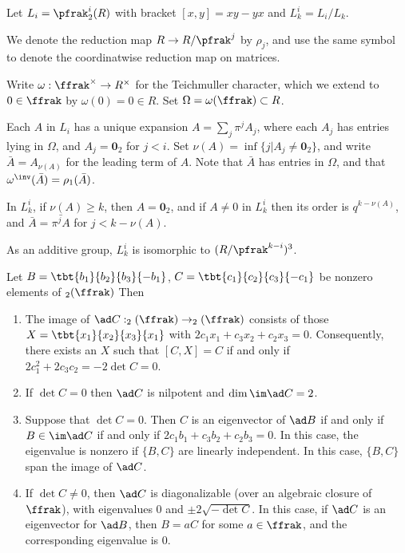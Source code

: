 Let $L_i = \pfrak^i \sl_2(R)$ with bracket $[x,y]=xy-yx$ and $L_k^i = L_i/L_k$.

We denote the reduction map $R \to R/\pfrak^j$ by $\rho_j$, and use the same symbol to denote the coordinatwise reduction map on matrices.

Write $\omega:\ffrak^\times \to R^\times$ for the Teichmuller character, which we extend to $0\in \ffrak$ by $\omega(0)=0 \in R$. Set $\Omega=\omega(\ffrak) \subset R$.

Each $A$ in $L_i$ has a unique expansion $A = \sum_j \pi^j A_j$, where each $A_j$ has entries lying in $\Omega$, and $A_j = \bm{0}_2$ for $j< i$. Set $\nu(A) = \inf\{j| A_j \neq \bm{0}_2\}$, and write $\bar{A}=A_{\nu(A)}$ for the leading term of $A$. Note that $\bar{A}$ has entries in $\Omega$, and that $\omega^\inv(\bar{A})=\rho_1(\bar{A})$.

In $L_k^i$, if $\nu(A) \geq k$, then $A=\bm{0}_2$, and if $A\neq 0$ in $L_k^i$ then its order is $q^{k-\nu(A)}$, and $\bar{A} = \bar{\pi^j A}$ for $j < k - \nu(A)$.

As an additive group, $L_k^i$ is isomorphic to $(R/\pfrak^{k-i})^3$.

\begin{lemma}
    Let $B=\tbt{b_1}{b_2}{b_3}{-b_1}$, $C=\tbt{c_1}{c_2}{c_3}{-c_1}$  be  nonzero elements of $\sl_2(\ffrak)$  Then
    \begin{enumerate}
        \item The image of $\ad C: \sl_2(\ffrak) \to \sl_2(\ffrak)$ consists of those  $X=\tbt{x_1}{x_2}{x_3}{x_1}$ with $2c_1 x_1 + c_3x_2 + c_2x_3 =0$. Consequently, there exists an $X$ such that $[C,X]=C$ if and only if $2c_1^2 +2c_3c_2=-2\det C =0$.
        \item If $\det C =0$ then $\ad C$ is nilpotent and $\dim \im \ad C =2$.
        \item Suppose that $\det C =0$. Then $C$ is an eigenvector of $\ad B$ if and only if $B \in \im \ad C$ if and only if $2c_1b_1+c_3b_2+c_2b_3 =0$. In this case, the eigenvalue is nonzero if $\{B,C\}$ are linearly independent. In this case, $\{B,C\}$ span the image of $\ad C$.
        \item If $\det C \neq 0$, then $\ad C$ is diagonalizable (over an algebraic closure of $\ffrak$), with eigenvalues $0$ and $\pm 2 \sqrt{- \det C}$. In this case, if $\ad C$ is an eigenvector for $\ad B$, then $B=aC$ for some $a\in \ffrak$, and the corresponding eigenvalue is $0$.
    \end{enumerate}
\end{lemma}


